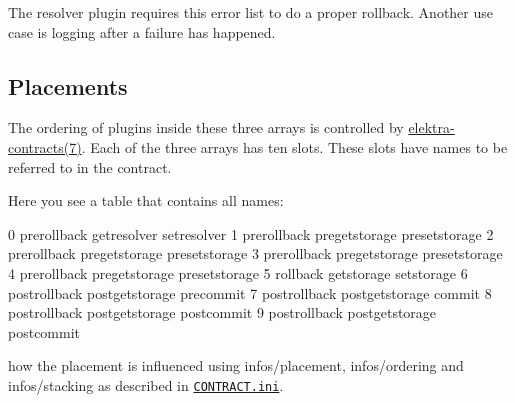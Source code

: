 The resolver plugin requires this error list to do a proper rollback. Another use case is logging after a failure has happened.

\subsection*{Placements}

The ordering of plugins inside these three arrays is controlled by \hyperlink{md_doc_help_elektra-contracts_doc_help_elektra-contracts_md}{elektra-\/contracts(7)}. Each of the three arrays has ten slots. These slots have names to be referred to in the contract.

Here you see a table that contains all names\+: \begin{DoxyVerb}    0     prerollback       getresolver         setresolver  
    1     prerollback       pregetstorage      presetstorage
    2     prerollback       pregetstorage      presetstorage
    3     prerollback       pregetstorage      presetstorage
    4     prerollback       pregetstorage      presetstorage
    5      rollback            getstorage         setstorage
    6    postrollback      postgetstorage      precommit     
    7    postrollback      postgetstorage         commit     
    8    postrollback      postgetstorage     postcommit     
    9    postrollback      postgetstorage     postcommit     
\end{DoxyVerb}


how the placement is influenced using infos/placement, infos/ordering and infos/stacking as described in \href{/home/markus/Projekte/Elektra/current/doc/CONTRACT.ini}{\tt C\+O\+N\+T\+R\+A\+C\+T.\+ini}. 